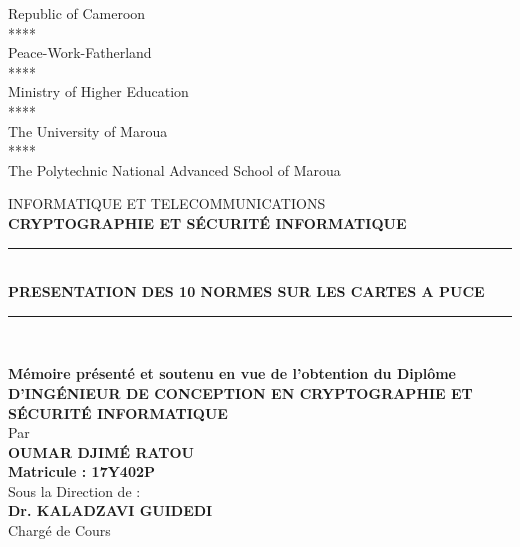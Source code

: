 \documentclass[12pt,a4paper]{report}
\newlength{\drop}
\begin{document}
\begin{minipage}[c]{.35\textwidth}
    \footnotesize
    \begin{center}
    Republic of Cameroon\\
	****\\
	Peace-Work-Fatherland\\
	****\\
	Ministry of Higher Education\\
	****\\
	The University of Maroua\\
	****\\
	The Polytechnic National Advanced School of Maroua\\
    \end{center}
\end{minipage}
\begin{center}
	\textheight %
	\vspace{0.5\drop}
	INFORMATIQUE ET TELECOMMUNICATIONS\\
	\textheight 
	\vspace{0.4\drop}
	\textbf{CRYPTOGRAPHIE ET SÉCURITÉ INFORMATIQUE}
	\rule{.95\textwidth}{2pt}\\
	\large{\textbf{PRESENTATION DES 10 NORMES SUR LES CARTES A PUCE}}\\
	\rule{.95\textwidth}{2pt}\\%

\end{center}


\begin{center}
	\textbf{Mémoire présenté et soutenu en vue de l’obtention du Diplôme}\\
	\vspace{0.2cm}
	\textbf{D’INGÉNIEUR DE CONCEPTION EN CRYPTOGRAPHIE ET SÉCURITÉ INFORMATIQUE}\\
	\vspace{0.2cm}
	Par \\
	\vspace{0.2cm}
	\textbf{OUMAR DJIMÉ RATOU}\\
	\vspace{0.2cm}
	\textbf{Matricule : 17Y402P}\\
	\vspace{0.3cm}
	Sous la Direction de : \\
	\vspace{0.2cm}
	\textbf{Dr. KALADZAVI GUIDEDI}\\
	\vspace{0.2cm}
	Chargé de Cours
	
	

\end{center}
\end{document}
